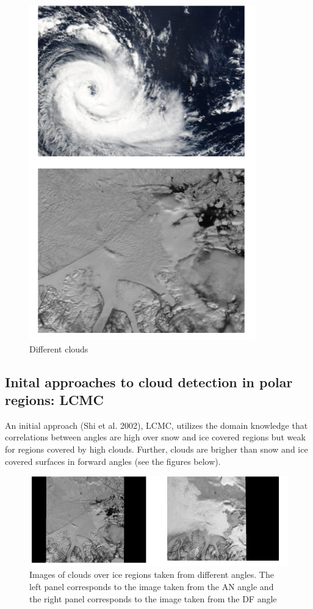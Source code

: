 \begin{figure}[H]
\begin{center}
\includegraphics[scale=0.4]{cloud.png}
\end{center}
\caption{Different clouds}
\label{fig:clouds}
\end{figure}



\subsection*{Inital approaches to cloud detection in polar regions: LCMC}

An initial approach (Shi et al. 2002), LCMC, utilizes the domain knowledge that correlations between angles are high over snow and ice covered regions but weak for regions covered by high clouds. Further, clouds are brigher than snow and ice covered surfaces in forward angles (see the figures below). 

\begin{figure}[H]
\begin{center}
\includegraphics[scale=0.4]{cloud_angles.png}
\end{center}
\caption{Images of clouds over ice regions taken from different angles. The left panel corresponds to the image taken from the AN angle and the right panel corresponds to the image taken from the DF angle}
\label{fig:clouds}
\end{figure}


